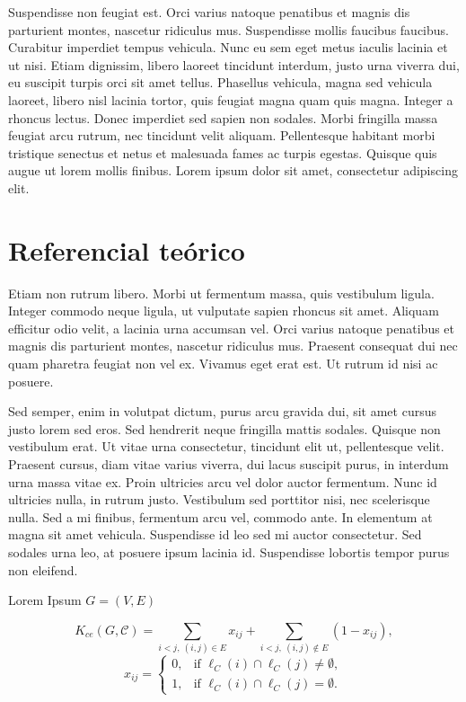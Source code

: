\documentclass{sciposter}
\begin{document}
\begin{multicols}{3}
Suspendisse non feugiat est. Orci varius natoque penatibus et magnis dis parturient montes, nascetur ridiculus mus. Suspendisse mollis faucibus faucibus. Curabitur imperdiet tempus vehicula. Nunc eu sem eget metus iaculis lacinia et ut nisi. Etiam dignissim, libero laoreet tincidunt interdum, justo urna viverra dui, eu suscipit turpis orci sit amet tellus. Phasellus vehicula, magna sed vehicula laoreet, libero nisl lacinia tortor, quis feugiat magna quam quis magna. Integer a rhoncus lectus. Donec imperdiet sed sapien non sodales. Morbi fringilla massa feugiat arcu rutrum, nec tincidunt velit aliquam. Pellentesque habitant morbi tristique senectus et netus et malesuada fames ac turpis egestas. Quisque quis augue ut lorem mollis finibus. Lorem ipsum dolor sit amet, consectetur adipiscing elit.

\section{Referencial teórico}

Etiam non rutrum libero. Morbi ut fermentum massa, quis vestibulum ligula. Integer commodo neque ligula, ut vulputate sapien rhoncus sit amet. Aliquam efficitur odio velit, a lacinia urna accumsan vel. Orci varius natoque penatibus et magnis dis parturient montes, nascetur ridiculus mus. Praesent consequat dui nec quam pharetra feugiat non vel ex. Vivamus eget erat est. Ut rutrum id nisi ac posuere.

Sed semper, enim in volutpat dictum, purus arcu gravida dui, sit amet cursus justo lorem sed eros. Sed hendrerit neque fringilla mattis sodales. Quisque non vestibulum erat. Ut vitae urna consectetur, tincidunt elit ut, pellentesque velit. Praesent cursus, diam vitae varius viverra, dui lacus suscipit purus, in interdum urna massa vitae ex. Proin ultricies arcu vel dolor auctor fermentum. Nunc id ultricies nulla, in rutrum justo. Vestibulum sed porttitor nisi, nec scelerisque nulla. Sed a mi finibus, fermentum arcu vel, commodo ante. In elementum at magna sit amet vehicula. Suspendisse id leo sed mi auctor consectetur. Sed sodales urna leo, at posuere ipsum lacinia id. Suspendisse lobortis tempor purus non eleifend.

    Lorem Ipsum $G = (V,E)$
    
  \begin{equation}
  \label{eq:lip_cc_of}
   K_{ce}(G, \mathcal{C}) = \sum\limits_{i < j, \ (i,j) \in E} x_{ij} +
      \sum\limits_{i < j, \ (i,j) \notin E} (1 - x_{ij}),
  \end{equation}
  \[
    x_{ij} = 
    \begin{cases}
            0, & \text{if } \ell_C(i) \cap \ell_C(j) \neq \emptyset,\\
            1, & \text{if } \ell_C(i) \cap \ell_C(j) = \emptyset.
    \end{cases}
  \]


\end{multicols}
\end{document}
